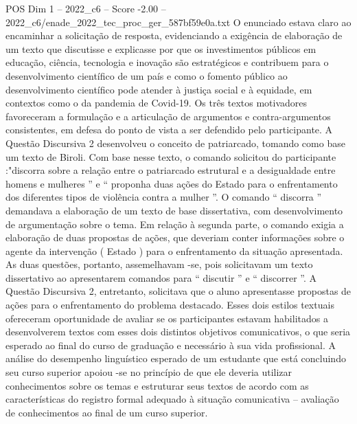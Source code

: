 \begin{textsample}{POS Dim 1 – 2022\_c6 – Score -2.00 – 2022\_c6/enade\_2022\_tec\_proc\_ger\_587bf59e0a.txt}
O enunciado estava claro ao encaminhar a solicitação de resposta, evidenciando a exigência de elaboração de um texto que discutisse e explicasse por que os investimentos públicos em educação, ciência, tecnologia e inovação são estratégicos e contribuem para o desenvolvimento científico de um país e como o fomento público ao desenvolvimento científico pode atender à justiça social e à equidade, em contextos como o da pandemia de Covid-19.
Os três textos motivadores favoreceram a formulação e a articulação de argumentos e contra-argumentos consistentes, em defesa do ponto de vista a ser defendido pelo participante.
A Questão Discursiva 2 desenvolveu o conceito de patriarcado, tomando como base um texto de Biroli.
Com base nesse texto, o comando solicitou do participante :"discorra sobre a relação entre o patriarcado estrutural e a desigualdade entre homens e mulheres ” e “ proponha duas ações do Estado para o enfrentamento dos diferentes tipos de violência contra a mulher ”.
O comando “ discorra ” demandava a elaboração de um texto de base dissertativa, com desenvolvimento de argumentação sobre o tema.
Em relação à segunda parte, o comando exigia a elaboração de duas propostas de ações, que deveriam conter informações sobre o agente da intervenção ( Estado ) para o enfrentamento da situação apresentada.
As duas questões, portanto, assemelhavam -se, pois solicitavam um texto dissertativo ao apresentarem comandos para “ discutir ” e “ discorrer ”.
A Questão Discursiva 2, entretanto, solicitava que o aluno apresentasse propostas de ações para o enfrentamento do problema destacado.
Esses dois estilos textuais ofereceram oportunidade de avaliar se os participantes estavam habilitados a desenvolverem textos com esses dois distintos objetivos comunicativos, o que seria esperado ao final do curso de graduação e necessário à sua vida profissional.
A análise do desempenho linguístico esperado de um estudante que está concluindo seu curso superior apoiou -se no princípio de que ele deveria utilizar conhecimentos sobre os temas e estruturar seus textos de acordo com as características do registro formal adequado à situação comunicativa – avaliação de conhecimentos ao final de um curso superior.

\end{textsample}
